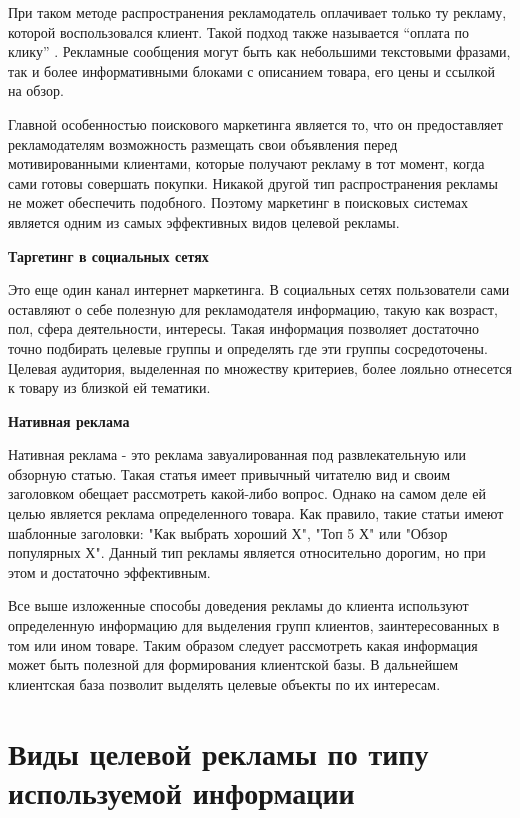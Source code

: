 При таком методе распространения рекламодатель оплачивает только ту рекламу, которой воспользовался клиент. Такой подход также называется “оплата по клику” . Рекламные сообщения могут быть как небольшими текстовыми фразами, так и более информативными блоками с описанием товара, его цены и ссылкой на обзор.

Главной особенностью поискового маркетинга является то, что он предоставляет рекламодателям возможность размещать свои объявления перед мотивированными клиентами, которые получают рекламу в тот момент, когда сами готовы совершать покупки. Никакой другой тип распространения рекламы не может обеспечить подобного. Поэтому маркетинг в поисковых системах является одним из самых эффективных видов целевой рекламы.

\textbf{Таргетинг в социальных сетях}

Это еще один канал интернет маркетинга. В социальных сетях пользователи сами оставляют о себе полезную для рекламодателя информацию, такую как возраст, пол, сфера деятельности, интересы. Такая информация позволяет достаточно точно подбирать целевые группы и определять где эти группы сосредоточены. Целевая аудитория, выделенная по множеству критериев, более лояльно отнесется к товару из близкой ей тематики.
    
\textbf{Нативная реклама}

Нативная реклама - это реклама завуалированная под развлекательную или обзорную статью. Такая статья имеет привычный читателю вид и своим заголовком обещает рассмотреть какой-либо вопрос. Однако на самом деле ей целью является реклама определенного товара. Как правило, такие статьи имеют шаблонные заголовки: "Как выбрать хороший Х", "Топ 5 Х" или "Обзор популярных Х". Данный тип рекламы является относительно дорогим, но при этом и достаточно эффективным.   

Все выше изложенные способы доведения рекламы до клиента используют определенную информацию для выделения групп клиентов, заинтересованных в том или ином товаре. Таким образом следует рассмотреть какая информация может быть полезной для формирования клиентской базы. В дальнейшем клиентская база позволит выделять целевые объекты по их интересам.
    
\section{Виды целевой рекламы по типу используемой информации} 
    
